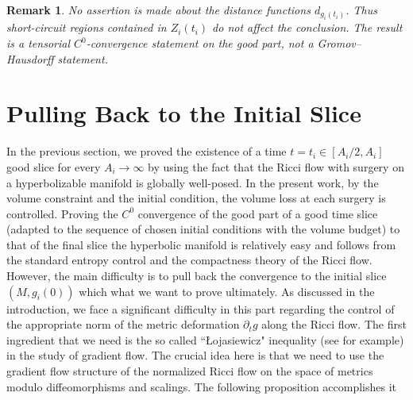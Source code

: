 \documentclass{amsart}
\newtheorem{remark}{Remark}
\begin{document}
\begin{remark}
 No assertion is made about the distance functions \(d_{g_i(t_i)}\).  Thus
short-circuit regions contained in \(Z_i(t_i)\) do not affect the conclusion.
The result is a tensorial \(C^0\)-convergence statement on the good part,
not a Gromov--Hausdorff statement.   
\end{remark}



















\section{Pulling Back to the Initial Slice}
\noindent In the previous section, we proved the existence of a time $t=t_{i}\in [A_{i}/2,A_{i}]$ good slice for every $A_{i}\to\infty$ by using the fact that the Ricci flow with surgery on a hyperbolizable manifold is globally well-posed. In the present work, by the volume constraint and the initial condition, the volume loss at each surgery is controlled. Proving the $C^{0}$ convergence of the good part of a good time slice (adapted to the sequence of chosen initial conditions with the volume budget) to that of the final slice the hyperbolic manifold is relatively easy and follows from the standard entropy control and the compactness theory of the Ricci flow. However, the main difficulty is to pull back the convergence to the initial slice $(M,g_{i}(0))$ which what we want to prove ultimately. As discussed in the introduction, we face a significant difficulty in this part regarding the control of the appropriate norm of the metric deformation $\partial_{t}g$ along the Ricci flow. The first ingredient that we need is the so called ``Łojasiewicz" inequality (see \cite{haslhofer2012perelman} for example) in the study of gradient flow. The crucial idea here is that we need to use the gradient flow structure of the normalized Ricci flow on the space of metrics modulo diffeomorphisms and scalings. The following proposition accomplishes it  
\end{document}
